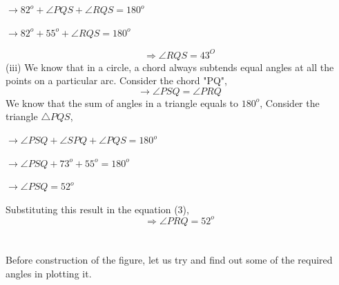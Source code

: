 \documentclass[8pt, twocolumn]{article}
\begin{document}
\begin{center}
    $\rightarrow 82^o + \angle PQS + \angle RQS = 180^o $
\end{center}
\begin{center}
    $\rightarrow 82^o + 55^o + \angle RQS = 180^o$
\end{center}
\begin{equation}
    \Rightarrow \angle RQS = 43^O
\end{equation}
(iii) We know that in a circle, a chord always subtends equal angles at all the points on a particular arc. Consider the chord "PQ",
\begin{equation}
    \rightarrow \angle PSQ = \angle PRQ
\end{equation}
We know that the sum of angles in a triangle equals to $180^o$, Consider the triangle $\triangle PQS$,
\begin{center}
    $\rightarrow \angle PSQ + \angle SPQ + \angle PQS = 180^o$ 
\end{center}
\begin{center}
    $\rightarrow \angle PSQ + 73^o + 55^o = 180^o $
\end{center}
\begin{center}
    $\rightarrow \angle PSQ = 52^o$
\end{center}
Substituting this result in the equation (3),
\begin{equation}
    \Rightarrow \angle PRQ = 52^o
\end{equation}\\\\
\newpage
Before construction of the figure, let us try and find out some of the required angles in plotting it.\\
\end{document}
